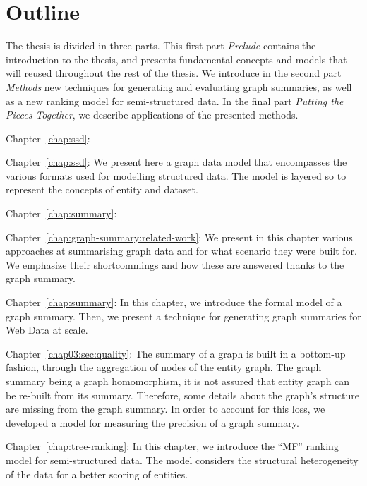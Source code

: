 \section{Outline}

The thesis is divided in three parts. This first part \emph{Prelude} contains the introduction to the thesis, and presents fundamental concepts and models that will reused throughout the rest of the thesis. We introduce in the second part \emph{Methods} new techniques for generating and evaluating graph summaries, as well as a new ranking model for semi-structured data. In the final part \emph{Putting the Pieces Together}, we describe applications of the presented methods.


\begin{labeling}{Chapter~\ref{chap:ssd}:}
\item[Chapter~\ref{chap:ssd}:] We present here a graph data model that encompasses the various formats used for modelling structured data. The model is layered so to represent the concepts of entity and dataset.%
\end{labeling}


\begin{labeling}{Chapter~\ref{chap:summary}:}
\item[Chapter~\ref{chap:graph-summary:related-work}:] We present in this chapter various approaches at summarising graph data and for what scenario they were built for. We emphasize their shortcommings and how these are answered thanks to the graph summary.
\item[Chapter~\ref{chap:summary}:] In this chapter, we introduce the formal model of a graph summary. Then, we present a technique for generating graph summaries for Web Data at scale.
\item[Chapter~\ref{chap03:sec:quality}:] The summary of a graph is built in a bottom-up fashion, through the aggregation of nodes of the entity graph. The graph summary being a graph homomorphism, it is not assured that entity graph can be re-built from its summary. Therefore, some details about the graph's structure are missing from the graph summary. In order to account for this loss, we developed a model for measuring the precision of a graph summary.
\item[Chapter~\ref{chap:tree-ranking}:] In this chapter, we introduce the ``MF'' ranking model for semi-structured data. The model considers the structural heterogeneity of the data for a better scoring of entities.
\end{labeling}

